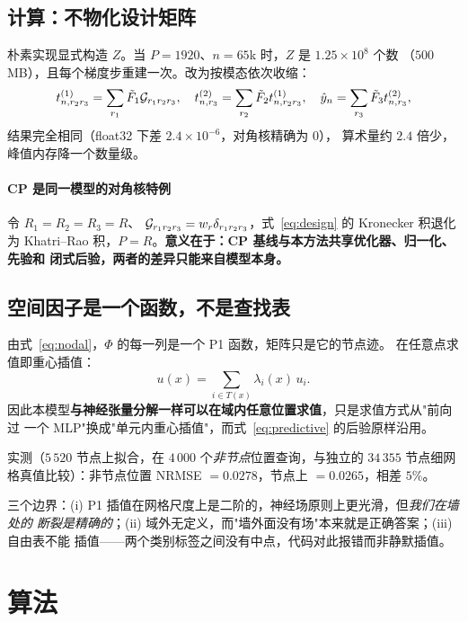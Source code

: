 \documentclass[11pt,a4paper]{article}
\begin{document}
\subsection{计算：不物化设计矩阵}

朴素实现显式构造 $Z$。当 $P=1920$、$n=65$k 时，$Z$ 是 $1.25\times10^8$ 个数
（$500$ MB），且每个梯度步重建一次。改为按模态依次收缩：
\begin{equation}
t^{(1)}_{n,r_2r_3}=\sum_{r_1}\tilde F_1\mathcal{G}_{r_1r_2r_3},\quad
t^{(2)}_{n,r_3}=\sum_{r_2}\tilde F_2t^{(1)}_{n,r_2r_3},\quad
\hat y_n=\sum_{r_3}\tilde F_3t^{(2)}_{n,r_3},
\end{equation}
结果完全相同（float32 下差 $2.4\times10^{-6}$，对角核精确为 $0$），
算术量约 $2.4$ 倍少，峰值内存降一个数量级。

\paragraph{CP 是同一模型的对角核特例} 令 $R_1=R_2=R_3=R$、
$\mathcal{G}_{r_1r_2r_3}=w_r\delta_{r_1r_2r_3}$，式~\eqref{eq:design} 的 Kronecker 积退化为
Khatri--Rao 积，$P=R$。\textbf{意义在于：CP 基线与本方法共享优化器、归一化、先验和
闭式后验，两者的差异只能来自模型本身。}

\subsection{空间因子是一个函数，不是查找表}
\label{sec:continuous}

由式~\eqref{eq:nodal}，$\Phi$ 的每一列是一个 P1 函数，矩阵只是它的节点迹。
在任意点求值即重心插值：
\begin{equation}
u(x)=\sum_{i\in T(x)}\lambda_i(x)\,u_i .
\end{equation}
因此本模型\textbf{与神经张量分解一样可以在域内任意位置求值}，只是求值方式从"前向过
一个 MLP"换成"单元内重心插值"，而式~\eqref{eq:predictive} 的后验原样沿用。

实测（$5\,520$ 节点上拟合，在 $4\,000$ 个\emph{非节点}位置查询，与独立的 $34\,355$
节点细网格真值比较）：非节点位置 NRMSE $=0.0278$，节点上 $=0.0265$，相差 $5\%$。

三个边界：(i) P1 插值在网格尺度上是二阶的，神经场原则上更光滑，但\emph{我们在墙处的
断裂是精确的}；(ii) 域外无定义，而"墙外面没有场"本来就是正确答案；(iii) 自由表不能
插值——两个类别标签之间没有中点，代码对此报错而非静默插值。

\section{算法}
\end{document}

